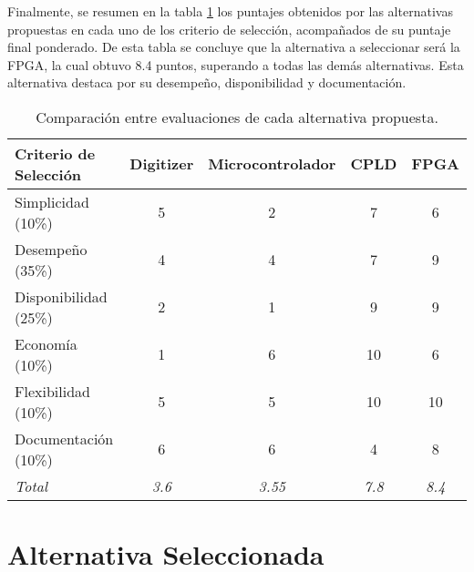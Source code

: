 \par Finalmente, se resumen en la tabla \ref{tab:comparacion} los puntajes obtenidos por las alternativas propuestas en cada uno de los criterio de selección, acompañados de su puntaje final ponderado. De esta tabla se concluye que la alternativa a seleccionar será la FPGA, la cual obtuvo 8.4 puntos, superando a todas las demás alternativas. Esta alternativa destaca por su desempeño, disponibilidad y documentación.

\begin{table}[H]
	\centering
	\begin{tabular}{|l|c|c|c|c|}
		\hline
		\textbf{Criterio de Selección} & \textbf{Digitizer} & \textbf{Microcontrolador} & \textbf{CPLD} & \textbf{FPGA} \\ \hline
		Simplicidad (10\%) & 5 & 2 & 7 & 6 \\ \hline
		Desempeño (35\%) & 4 & 4 & 7 & 9 \\ \hline
		Disponibilidad (25\%) & 2 & 1 & 9 & 9 \\ \hline
		Economía (10\%) & 1 & 6 & 10 & 6 \\ \hline
		Flexibilidad (10\%) & 5 & 5 & 10 & 10 \\ \hline
		Documentación (10\%) & 6 & 6 & 4 & 8 \\ \hline
		\textit{Total} & \textit{3.6} & \textit{3.55} & \textit{7.8} & \textit{8.4} \\ \hline
	\end{tabular}
	\caption{Comparación entre evaluaciones de cada alternativa propuesta.}
	\label{tab:comparacion}
\end{table}


\section{Alternativa Seleccionada}
\label{alternativa}

